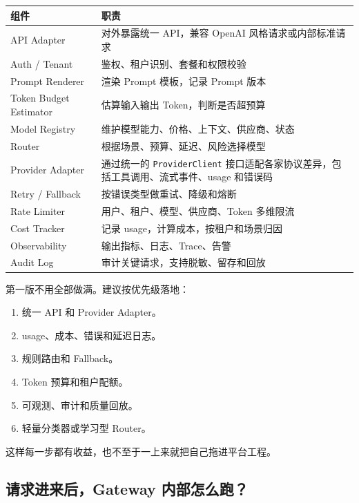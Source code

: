 \documentclass[9pt,a4paper,twocolumn]{ctexart}
\begin{document}
{\footnotesize
\begin{tabular}{|p{}|p{}|}
\hline
\textbf{组件} & \textbf{职责} \\
\hline
API Adapter & 对外暴露统一 API，兼容 OpenAI 风格请求或内部标准请求 \\
\hline
Auth / Tenant & 鉴权、租户识别、套餐和权限校验 \\
\hline
Prompt Renderer & 渲染 Prompt 模板，记录 Prompt 版本 \\
\hline
Token Budget Estimator & 估算输入输出 Token，判断是否超预算 \\
\hline
Model Registry & 维护模型能力、价格、上下文、供应商、状态 \\
\hline
Router & 根据场景、预算、延迟、风险选择模型 \\
\hline
Provider Adapter & 通过统一的 \texttt{ProviderClient} 接口适配各家协议差异，包括工具调用、流式事件、usage 和错误码 \\
\hline
Retry / Fallback & 按错误类型做重试、降级和熔断 \\
\hline
Rate Limiter & 用户、租户、模型、供应商、Token 多维限流 \\
\hline
Cost Tracker & 记录 usage，计算成本，按租户和场景归因 \\
\hline
Observability & 输出指标、日志、Trace、告警 \\
\hline
Audit Log & 审计关键请求，支持脱敏、留存和回放 \\
\hline
\end{tabular}
}



第一版不用全部做满。建议按优先级落地：


\begin{enumerate}[itemsep=1pt, topsep=2pt]
  \item 统一 API 和 Provider Adapter。
  \item usage、成本、错误和延迟日志。
  \item 规则路由和 Fallback。
  \item Token 预算和租户配额。
  \item 可观测、审计和质量回放。
  \item 轻量分类器或学习型 Router。
\end{enumerate}


这样每一步都有收益，也不至于一上来就把自己拖进平台工程。



\subsection*{请求进来后，Gateway 内部怎么跑？}
\end{document}
